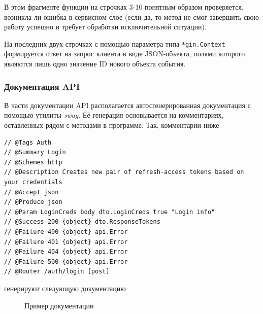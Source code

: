 \documentclass[diploma]{SCWorks}
\begin{document}
В этом фрагменте функции на строчках 3-10 понятным образом проверяется, возникла
ли ошибка в сервисном слое (если да, то метод не смог завершить свою 
работу успешно и требует обработки исключительной ситуации).

На последних двух строчках с помощью параметра типа \texttt{*gin.Context} 
формируется ответ на запрос клиента в виде JSON-объекта, полями которого 
являются лишь одно значение ID нового объекта события.

\subsubsection{Документация API}

В части документации API располагается автосгенерированная документация с 
помощью утилиты \textit{swag}. Её генерация основывается на комментариях, 
оставленных рядом с методами в программе. Так, комментарии ниже
\begin{verbatim}
// @Tags Auth
// @Summary Login
// @Schemes http
// @Description Creates new pair of refresh-access tokens based on your credentials
// @Accept json
// @Produce json
// @Param LoginCreds body dto.LoginCreds true "Login info"
// @Success 200 {object} dto.ResponseTokens
// @Failure 400 {object} api.Error
// @Failure 401 {object} api.Error
// @Failure 404 {object} api.Error
// @Failure 500 {object} api.Error
// @Router /auth/login [post]
\end{verbatim}
генерируют следующую документацию
\begin{figure}[H]
	\caption{Пример документации}
	\label{pic:doc_example}
\end{figure}
\end{document}
